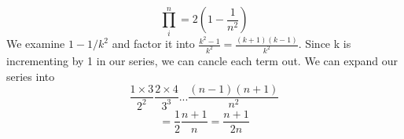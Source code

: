 \documentclass[12pt]{article}
\begin{document}
\subsection{}


\subsection{}

$$\prod^n_i=2 (1-\frac{1}{n^2})$$
We examine $1-1/k^2$ and factor it into $\frac{k^2-1}{k^2} = \frac{(k+1)(k-1)}{k^2}$. Since k is incrementing by 1 in our series, we can cancle each term out. We can expand our series into
$$\frac{1\times 3}{2^2} \frac{2 \times 4}{3^3} ... \frac{(n-1)(n+1)}{n^2}$$
$$= \frac{1}{2} \frac{n+1}{n} = \frac{n+1}{2n}$$
\end{document}
